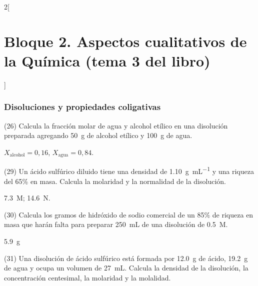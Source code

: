 \documentclass[10pt]{article}
\begin{document}
\begin{multicols}{2}[
    \section{Bloque 2. Aspectos cualitativos de la Química (tema 3 del libro)}
  ]
\subsubsection{Disoluciones y propiedades coligativas}




\begin{exercise}[
    tags    = {},
    topics  = {química,química básica},
    source  = {FQ 1B MGH 2016, p85, e26},
  ]
  (26) Calcula la fracción molar de agua y alcohol etílico en una
  disolución preparada agregando \SI{50}{\gram} de alcohol etílico y \SI{100}{\gram} de agua.
\end{exercise}

\begin{solution}
  \( X_\textrm{alcohol} = 0,16 \), \( X_\textrm{agua} = 0,84 \).
\end{solution}




\begin{exercise}[
    tags    = {},
    topics  = {química,química básica},
    source  = {FQ 1B MGH 2016, p85, e29},
  ]
  (29) Un ácido sulfúrico diluido tiene una densidad de \SI{1.10}{\gram\per\milli\liter} y una riqueza del 65\% en masa. Calcula la molaridad y la normalidad de la disolución.
\end{exercise}

\begin{solution}
  \SI{7.3}{M}; \SI{14.6}{N}.
\end{solution}




\begin{exercise}[
    tags    = {},
    topics  = {química,química básica},
    source  = {FQ 1B MGH 2016, p85, e30},
  ]
  (30) Calcula los gramos de hidróxido de sodio comercial de un
  85\% de riqueza en masa que harán falta para preparar \SI{250}{\milli\liter} de una disolución de  \SI{0.5}{M}.
\end{exercise}

\begin{solution}
\SI{5.9}{\gram}
\end{solution}




\begin{exercise}[
    tags    = {},
    topics  = {química,química básica},
    source  = {FQ 1B MGH 2016, p85, e31},
  ]
  (31) Una disolución de ácido sulfúrico está formada por \SI{12.0}{\gram} de
  ácido, \SI{19.2}{\gram} de agua y ocupa un volumen de \SI{27}{\milli\liter}. Calcula la densidad de la disolución, la concentración centesimal, la molaridad y la molalidad.
\end{exercise}


\end{multicols}
\end{document}
